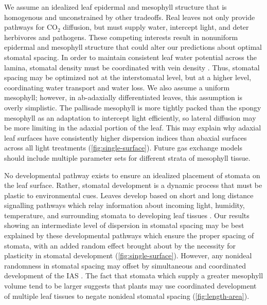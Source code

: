 \documentclass[webpdf,large,modern,unnumsec,namedate]{oup-authoring-template}
\begin{document}
We assume an idealized leaf epidermal and mesophyll structure that is
homogenous and unconstrained by other tradeoffs. Real leaves not only
provide pathways for CO\(_2\) diffusion, but must supply water,
intercept light, and deter herbivores and pathogens. These competing
interests result in nonuniform epidermal and mesophyll structure that
could alter our predictions about optimal stomatal spacing. In order to
maintain consistent leaf water potential across the lamina, stomatal
density must be coordinated with vein density
\citep{fiorin_transport_2016}. Thus, stomatal spacing may be optimized
not at the interstomatal level, but at a higher level, coordinating
water transport and water loss. We also assume a uniform mesophyll;
however, in ab-adaxially differentiated leaves, this assumption is
overly simplistic. The pallisade mesophyll is more tightly packed than
the spongy mesophyll as an adaptation to intercept light efficiently, so
lateral diffusion may be more limiting in the adaxial portion of the
leaf. This may explain why adaxial leaf surfaces have consistently
higher dispersion indices than abaxial surfaces across all light
treatments (\autoref{fig:single-surface}). Future gas exchange models
should include multiple parameter sets for different strata of mesophyll
tissue.

No developmental pathway exists to ensure an idealized placement of
stomata on the leaf surface. Rather, stomatal development is a dynamic
process that must be plastic to environmental cues. Leaves develop based
on short and long distance signalling pathways which relay information
about incoming light, humidity, temperature, and surrounding stomata to
developing leaf tissues \citep{pillitteri_mechanisms_2012}. Our results
showing an intermediate level of dispersion in stomatal spacing may be
best explained by these developmental pathways which ensure the proper
spacing of stomata, with an added random effect brought about by the
necessity for plasticity in stomatal development
(\autoref{fig:single-surface}). However, any nonideal randomness in
stomatal spacing may offset by simultaneous and coordinated development
of the IAS \citep{baillie_developmental_2020}. The fact that stomata
which supply a greater mesophyll volume tend to be larger suggests that
plants may use coordinated development of multiple leaf tissues to
negate nonideal stomatal spacing (\autoref{fig:length-area}).
\end{document}
